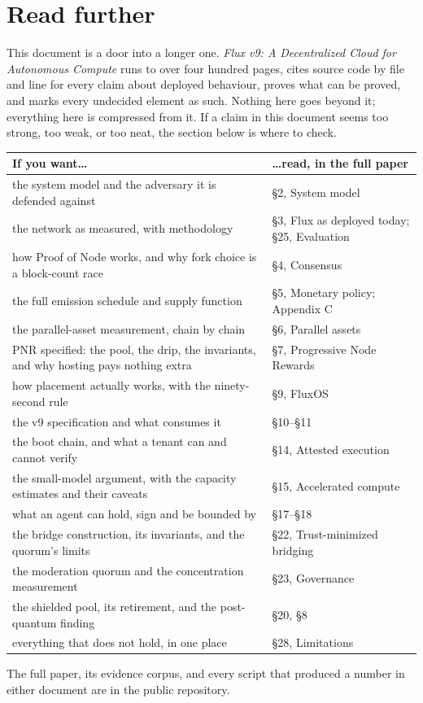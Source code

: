 \section*{Read further}
\label{sec:short:further}

This document is a door into a longer one. \emph{Flux v9: A Decentralized Cloud for Autonomous
Compute} runs to over four hundred pages, cites source code by file and line for every claim about
deployed behaviour, proves what can be proved, and marks every undecided element as such. Nothing
here goes beyond it; everything here is compressed from it. If a claim in this document seems too
strong, too weak, or too neat, the section below is where to check.

\begin{center}\small
\begin{tabular}{@{}p{5.2cm}p{8.4cm}@{}}
\toprule
If you want\ldots & \ldots read, in the full paper \\
\midrule
the system model and the adversary it is defended against & \S2, System model \\
the network as measured, with methodology & \S3, Flux as deployed today; \S25, Evaluation \\
how Proof of Node works, and why fork choice is a block-count race & \S4, Consensus \\
the full emission schedule and supply function & \S5, Monetary policy; Appendix C \\
the parallel-asset measurement, chain by chain & \S6, Parallel assets \\
PNR specified: the pool, the drip, the invariants, and why hosting pays nothing extra & \S7, Progressive Node Rewards \\
how placement actually works, with the ninety-second rule & \S9, FluxOS \\
the v9 specification and what consumes it & \S10--\S11 \\
the boot chain, and what a tenant can and cannot verify & \S14, Attested execution \\
the small-model argument, with the capacity estimates and their caveats & \S15, Accelerated compute \\
what an agent can hold, sign and be bounded by & \S17--\S18 \\
the bridge construction, its invariants, and the quorum's limits & \S22, Trust-minimized bridging \\
the moderation quorum and the concentration measurement & \S23, Governance \\
the shielded pool, its retirement, and the post-quantum finding & \S20, \S8 \\
everything that does not hold, in one place & \S28, Limitations \\
\bottomrule
\end{tabular}
\end{center}

The full paper, its evidence corpus, and every script that produced a number in either document are
in the public repository.
